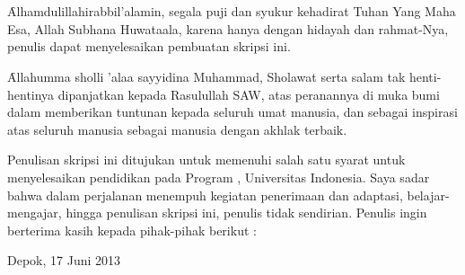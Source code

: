 \chapter*{\kataPengantar}
\f{Alhamdulillahirabbil'alamin}, segala puji dan syukur kehadirat Tuhan Yang Maha Esa, Allah Subhana Huwataala, karena hanya dengan hidayah dan rahmat-Nya, penulis dapat menyelesaikan pembuatan skripsi ini.

\f{Allahumma sholli 'alaa sayyidina Muhammad}, Sholawat serta salam tak henti-hentinya dipanjatkan kepada Rasulullah SAW, atas peranannya di muka bumi dalam memberikan tuntunan kepada seluruh umat manusia, dan sebagai inspirasi atas seluruh manusia sebagai manusia dengan akhlak terbaik.

Penulisan skripsi ini ditujukan untuk memenuhi salah satu syarat untuk menyelesaikan pendidikan pada Program \gelar, Universitas Indonesia. Saya sadar bahwa dalam perjalanan menempuh kegiatan penerimaan dan adaptasi, belajar-mengajar, hingga penulisan skripsi ini, penulis tidak sendirian. Penulis ingin berterima kasih kepada pihak-pihak berikut : 

\vspace*{0.1cm}
\begin{flushright}
Depok, 17 Juni 2013\\[0.1cm]
\vspace*{1cm}
\penulis

\end{flushright}